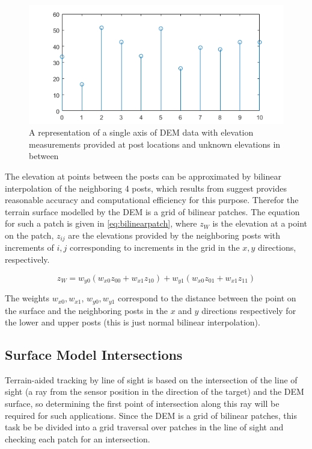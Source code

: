 \documentclass[journal]{IEEEtran}
\begin{document}
\begin{figure}[ht]
    \centering
    \includegraphics[scale=0.6]{PostsBasic.png}
    \caption{A representation of a single axis of DEM data with elevation measurements provided at post locations and unknown elevations in between}
    \label{fig:demposts}
\end{figure}

The elevation at points between the posts can be approximated by bilinear interpolation of the neighboring 4 posts, which results from \cite{li2005accuracy} suggest provides reasonable accuracy and computational efficiency for this purpose. Therefor the terrain surface modelled by the DEM is a grid of bilinear patches. The equation for such a patch is given in \ref{eq:bilinearpatch}, where $z_W$ is the elevation at a point on the patch, $z_{ij}$ are the elevations provided by the neighboring posts with increments of $i,j$ corresponding to increments in the grid in the $x,y$ directions, respectively.

\begin{dmath} \label{eq:bilinearpatch}
    z_W = w_{y0} (w_{x0} z_{00} + w_{x1} z_{10}) + w_{y1} (w_{x0} z_{01} + w_{x1} z_{11})
\end{dmath}

The weights $w_{x0}, w_{x1}$, $w_{y0}, w_{y1}$ correspond to the distance between the point on the surface and the neighboring posts in the $x$ and $y$ directions respectively for the lower and upper posts (this is just normal bilinear interpolation).

\subsection{Surface Model Intersections} \label{surfaceintersections}
Terrain-aided tracking by line of sight is based on the intersection of the line of sight (a ray from the sensor position in the direction of the target) and the DEM surface, so determining the first point of intersection along this ray will be required for such applications. Since the DEM is a grid of bilinear patches, this task be be divided into a grid traversal over patches in the line of sight and checking each patch for an intersection.
\end{document}
